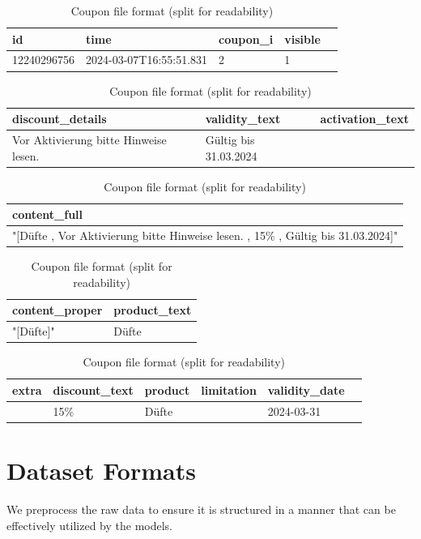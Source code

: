 \documentclass[licencjacka,en]{pracamgr}
\begin{document}
\begin{table}[h]
\centering

\begin{tabular}{lllll}
\toprule
id & time & coupon\_i & visible \\
\midrule
12240296756 & 2024-03-07T16:55:51.831 & 2 & 1 \\
\bottomrule
\end{tabular}

\vspace{1em}

\begin{tabular}{lll}
\toprule
discount\_details & validity\_text & activation\_text \\
\midrule
Vor Aktivierung bitte Hinweise lesen. & Gültig bis 31.03.2024   \\
\bottomrule
\end{tabular}

\vspace{1em}

\begin{tabular}{l}
\toprule
content\_full \\
\midrule
"[Düfte ,  Vor Aktivierung bitte Hinweise lesen. ,  15\% ,  Gültig bis 31.03.2024]"  \\
\bottomrule
\end{tabular}

\vspace{1em}

\begin{tabular}{ll}
\toprule
content\_proper & product\_text \\
\midrule
"[Düfte]" & Düfte \\
\bottomrule
\end{tabular}

\vspace{1em}

\begin{tabular}{llllll}
\toprule
extra & discount\_text & product & limitation & validity\_date \\
\midrule
 & 15\% & Düfte &  & 2024-03-31 \\
\bottomrule
\end{tabular}

\caption{Coupon file format (split for readability)}
\label{tab:csv_raw_coupons}
\end{table}

\section{Dataset Formats}
We preprocess the raw data to ensure it is structured in a manner that can be effectively utilized by the models.
\end{document}
